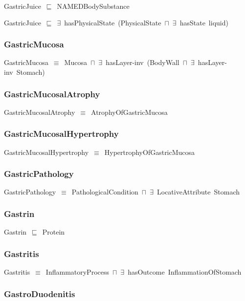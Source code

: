 \documentclass{article}
\begin{document}
GastricJuice~\ensuremath{\sqsubseteq}~NAMEDBodySubstance~

GastricJuice~\ensuremath{\sqsubseteq}~\ensuremath{\exists}~hasPhysicalState~(PhysicalState~\ensuremath{\sqcap}~\ensuremath{\exists}~hasState~liquid)~

\subsubsection*{GastricMucosa}

GastricMucosa~\ensuremath{\equiv}~Mucosa~\ensuremath{\sqcap}~\ensuremath{\exists}~hasLayer-inv~(BodyWall~\ensuremath{\sqcap}~\ensuremath{\exists}~hasLayer-inv~Stomach)

\subsubsection*{GastricMucosalAtrophy}

GastricMucosalAtrophy~\ensuremath{\equiv}~AtrophyOfGastricMucosa

\subsubsection*{GastricMucosalHypertrophy}

GastricMucosalHypertrophy~\ensuremath{\equiv}~HypertrophyOfGastricMucosa

\subsubsection*{GastricPathology}

GastricPathology~\ensuremath{\equiv}~PathologicalCondition~\ensuremath{\sqcap}~\ensuremath{\exists}~LocativeAttribute~Stomach

\subsubsection*{Gastrin}

Gastrin~\ensuremath{\sqsubseteq}~Protein~

\subsubsection*{Gastritis}

Gastritis~\ensuremath{\equiv}~InflammatoryProcess~\ensuremath{\sqcap}~\ensuremath{\exists}~hasOutcome~InflammationOfStomach

\subsubsection*{GastroDuodenitis}
\end{document}
